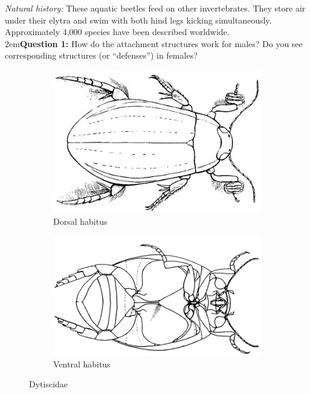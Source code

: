 \documentclass[letterpaper, 11pt]{article}
\begin{document}
\noindent{}\textit{Natural history:} These aquatic beetles feed on other invertebrates. They store air under their elytra and swim with both hind legs kicking simultaneously. Approximately 4,000 species have been described worldwide.\\

\hangindent2em\textbf{Question 1:} How do the attachment structures work for males? Do you see corresponding structures (or ``defenses'') in females?\\

\begin{figure}[ht!]
  \centering
\begin{subfigure}[ht!]{0.4\textwidth}
    \includegraphics[width=\textwidth]{dyticiddorsal.png}
  \caption{Dorsal habitus \citep[][Fig. 96B]{bhlitem56570}}
  \label{fig:dytiscidHabitus1}
\end{subfigure}
    \hfill
\begin{subfigure}[ht!]{0.45\textwidth}
    \includegraphics[width=\textwidth]{dytiscidVentral.png}
  \caption{Ventral habitus \citep[Modified from Fig. 13:9 in][]{bhlitem126080aquatic}}
  \label{fig:dytiscidHabitus2}
\end{subfigure}
    \caption{Dytiscidae}\label{fig:dytiscids}
\end{figure}
\end{document}
